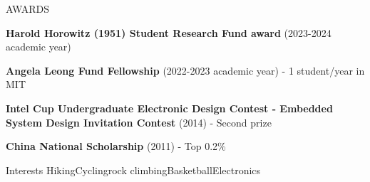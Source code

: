 \documentclass{resume} %
\begin{document}
\begin{rSection}{AWARDS}

\begin{itemlabel}
\item \textbf{Harold Horowitz (1951) Student Research Fund award} (2023-2024 academic year)
\smallskip
\smallskip

\item \textbf{Angela Leong Fund Fellowship} (2022-2023 academic year) - 1 student/year in MIT
\smallskip
\smallskip

\item \textbf{Intel Cup Undergraduate Electronic Design Contest - Embedded System Design Invitation Contest} (2014) - Second prize
\smallskip
\smallskip

\item \textbf{China National Scholarship} (2011) - Top 0.2\%
\smallskip
\smallskip

\end{itemlabel}
\end{rSection}

\begin{rSection}{Interests}
Hiking\hspace{1cm}Cycling\hspace{1cm}rock climbing\hspace{1cm}Basketball\hspace{1cm}Electronics
\end{rSection}

\end{document}
